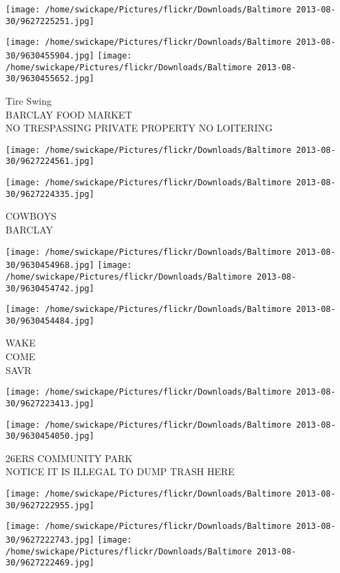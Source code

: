 \documentclass[10pt,letterpaper]{article}
\begin{document}
\texttt{[image: /home/swickape/Pictures/flickr/Downloads/Baltimore 2013-08-30/9627225251.jpg]}

\vspace{0.25in}
\texttt{[image: /home/swickape/Pictures/flickr/Downloads/Baltimore 2013-08-30/9630455904.jpg]}
\texttt{[image: /home/swickape/Pictures/flickr/Downloads/Baltimore 2013-08-30/9630455652.jpg]}

Tire Swing\\
BARCLAY FOOD MARKET\\
NO TRESPASSING PRIVATE PROPERTY NO LOITERING
\pagebreak

\texttt{[image: /home/swickape/Pictures/flickr/Downloads/Baltimore 2013-08-30/9627224561.jpg]}

\vspace{0.25in}
\texttt{[image: /home/swickape/Pictures/flickr/Downloads/Baltimore 2013-08-30/9627224335.jpg]}

COWBOYS\\
BARCLAY
\pagebreak

\texttt{[image: /home/swickape/Pictures/flickr/Downloads/Baltimore 2013-08-30/9630454968.jpg]}
\texttt{[image: /home/swickape/Pictures/flickr/Downloads/Baltimore 2013-08-30/9630454742.jpg]}

\texttt{[image: /home/swickape/Pictures/flickr/Downloads/Baltimore 2013-08-30/9630454484.jpg]}

WAKE\\
COME\\
SAVR
\pagebreak

\texttt{[image: /home/swickape/Pictures/flickr/Downloads/Baltimore 2013-08-30/9627223413.jpg]}

\vspace{0.25in}
\texttt{[image: /home/swickape/Pictures/flickr/Downloads/Baltimore 2013-08-30/9630454050.jpg]}

26ERS COMMUNITY PARK\\
NOTICE IT IS ILLEGAL TO DUMP TRASH HERE
\pagebreak

\texttt{[image: /home/swickape/Pictures/flickr/Downloads/Baltimore 2013-08-30/9627222955.jpg]}

\vspace{0.25in}
\texttt{[image: /home/swickape/Pictures/flickr/Downloads/Baltimore 2013-08-30/9627222743.jpg]}
\texttt{[image: /home/swickape/Pictures/flickr/Downloads/Baltimore 2013-08-30/9627222469.jpg]}
\end{document}
